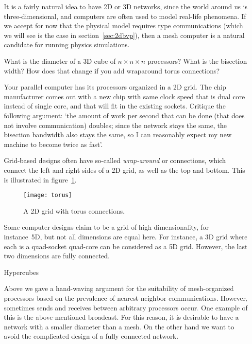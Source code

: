 It is a fairly natural idea to have 2D or 3D networks, since the world
around us is three-dimensional, and computers are often used to model
real-life phenomena. If we accept for now that the physical model
requires  type communications (which we
will see is the case in section~\ref{sec:2dbvp}), then a mesh computer
is a natural candidate for running physics simulations.

\begin{exercise}
  \label{ex:bisection-cube}
  What is the diameter of a 3D cube of $n\times n\times n$ processors? What is the
  bisection width? How does that change if you add wraparound torus
  connections?
\end{exercise}

\begin{exercise}
  Your parallel computer has its processors organized in a 2D grid.
  The chip manufacturer comes out with a new chip with same clock
  speed that is dual core instead of single core, and that will fit in
  the existing sockets. Critique the following argument: `the amount of
  work per second that can be done (that does not involve communication)
  doubles; since the network stays the same, the bisection bandwidth
  also stays the same, so I can reasonably expect my new machine to
  become twice as fast'.
\end{exercise}

Grid-based designs often have so-called \emph{wrap-around} or
 connections, which connect the left and right sides
of a 2D grid, as well as the top and bottom. This is illustrated in
figure~\ref{fig:torus}.
\begin{figure}[th]
  \texttt{[image: torus]}
  \caption{A 2D grid with torus connections.}
  \label{fig:torus}
\end{figure}

Some computer designs claim to be a grid of high dimensionality, for
instance~5D, but not all dimensions are equal here. For instance, a 3D
grid where each  is a quad-socket 
quad-core can be considered as a
5D grid. However, the last two dimensions are fully connected.

 {Hypercubes}
\label{sec:hypercube}

Above we gave a hand-waving argument for the suitability of
mesh-organized processors based on the prevalence of nearest
neighbor communications. However, sometimes sends and receives
between arbitrary processors occur. One example of this is the
above-mentioned broadcast. For this reason, it is desirable to have a
network with a smaller diameter than a mesh. On the other hand we want
to avoid the complicated design of a fully connected network.

